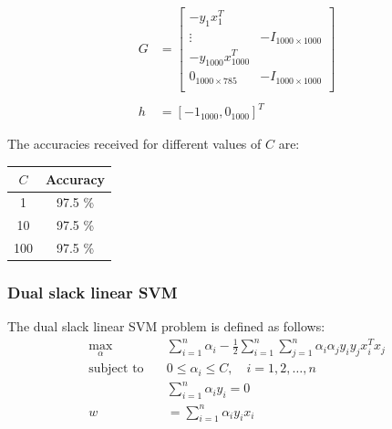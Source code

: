 \documentclass[12pt]{article}
\begin{document}
\begin{align*}
    G &= \begin{bmatrix}
        -y_1x_1^T \\ 
        \vdots & -I_{1000 \times 1000} \\ 
        -y_{1000}x_{1000}^T \\
        0_{1000 \times 785} & -I_{1000 \times 1000} \\
    \end{bmatrix} \\ \\
    h &= [-1_{1000}, 0_{1000}]^T
\end{align*}

The accuracies received for different values of $C$ are:
\begin{center}
    \begin{tabular}{|c|c|}
        \hline
        $C$ & Accuracy \\
        \hline
        1 & 97.5 \% \\
        10 & 97.5 \% \\
        100 & 97.5 \% \\
        \hline
    \end{tabular}
\end{center}

\subsubsection{Dual slack linear SVM}
The dual slack linear SVM problem is defined as follows:
\begin{align*}
    \max_{\alpha} \quad &\sum_{i=1}^{n}\alpha_i - \frac{1}{2}\sum_{i=1}^{n}\sum_{j=1}^{n}\alpha_i\alpha_jy_iy_jx_i^Tx_j \\
    \text{subject to} \quad &0 \leq \alpha_i \leq C, \quad i = 1, 2, \ldots, n \\
    &\sum_{i=1}^{n}\alpha_iy_i = 0 \\
    w &= \sum_{i=1}^{n}\alpha_iy_ix_i
\end{align*}
\end{document}
